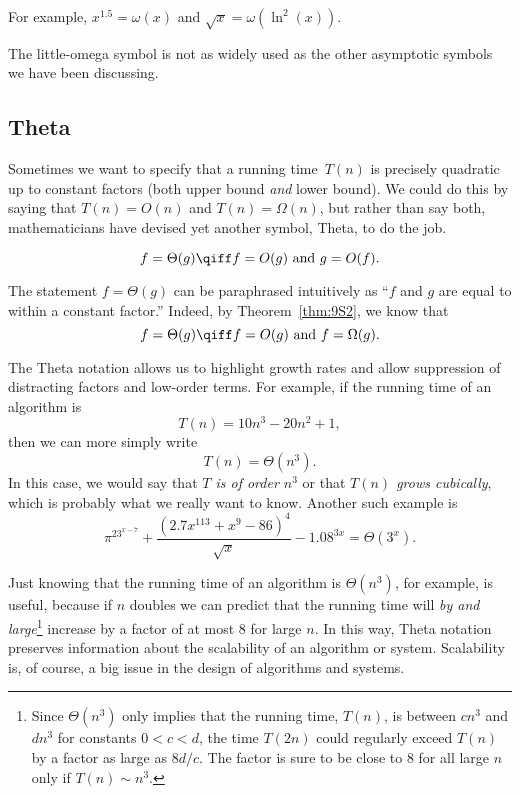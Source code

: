 For example, $x^{1.5} = \omega(x)$ and $\sqrt{x} = \omega(\ln^2(x))$.

The little-omega symbol is not as widely used as the other asymptotic
symbols we have been discussing.


\subsection{\index{$\Theta()$}Theta}

Sometimes we want to specify that a running time~$T(n)$ is precisely
quadratic up to constant factors (both upper bound \emph{and} lower
bound).  We could do this by saying that $T(n) = O(n)$ and $T(n) =
\Omega(n)$, but rather than say both, mathematicians have devised yet
another symbol, Theta, to do the job.

\begin{definition}\label{def:Theta}
\[
    f = \Theta(g)
    \qiff
    f=O(g) \text{ and } g=O(f).
\]
\end{definition}

The statement $f = \Theta(g)$ can be paraphrased intuitively as
``$f$ and $g$ are equal to within a constant factor.''  Indeed, by
Theorem~\ref{thm:9S2}, we know that
\begin{equation*}
    f = \Theta(g) \qiff \text{$f = O(g)$ and $f = \Omega(g)$}.
\end{equation*}

The Theta notation allows us to highlight growth rates and allow
suppression of distracting factors and low-order terms.  For example,
if the running time of an algorithm is
\[
T(n) = 10n^3 - 20n^2 + 1,
\]
then we can more simply write
\[
T(n) = \Theta(n^3).
\]
In this case, we would say that \emph{$T$ is of order $n^3$} or that
\emph{$T(n)$ grows cubically}, which is probably what we really want
to know.  Another such example is
\[
{{\pi^23^{x-7} + \frac{(2.7x^{113} + x^9- 86)^4}{\sqrt{x}} - 1.08^{3x}}} =
\Theta(3^x).
\]

Just knowing that the running time of an algorithm is $\Theta(n^3)$,
for example, is useful, because if $n$ doubles we can predict that the
running time will \emph{by and large}\footnote{Since $\Theta(n^3)$
  only implies that the running time, $T(n)$, is between $cn^3$ and
  $dn^3$ for constants $0<c<d$, the time $T(2n)$ could regularly
  exceed $T(n)$ by a factor as large as $8d/c$.  The factor is sure to
  be close to 8 for all large $n$ only if $T(n) \sim n^3$.} increase
by a factor of at most $8$ for large $n$.  In this way, Theta notation
preserves information about the scalability of an algorithm or system.
Scalability is, of course, a big issue in the design of algorithms and
systems.


